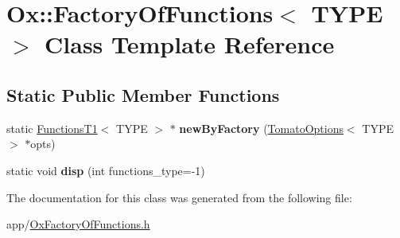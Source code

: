 \hypertarget{class_ox_1_1_factory_of_functions}{\section{Ox\-:\-:Factory\-Of\-Functions$<$ T\-Y\-P\-E $>$ Class Template Reference}
\label{class_ox_1_1_factory_of_functions}
}
\subsection*{Static Public Member Functions}
\begin{DoxyCompactItemize}
\item 
\hypertarget{class_ox_1_1_factory_of_functions_a188a9a0d61fcbca185c90e548be71bf0}{static \hyperlink{class_ox_1_1_functions_t1}{Functions\-T1}$<$ T\-Y\-P\-E $>$ $\ast$ {\bfseries new\-By\-Factory} (\hyperlink{struct_ox_1_1_tomato_options}{Tomato\-Options}$<$ T\-Y\-P\-E $>$ $\ast$opts)}\label{class_ox_1_1_factory_of_functions_a188a9a0d61fcbca185c90e548be71bf0}

\item 
\hypertarget{class_ox_1_1_factory_of_functions_aa723d7a59c0bfc42d25f5599bb36cd33}{static void {\bfseries disp} (int functions\-\_\-type=-\/1)}\label{class_ox_1_1_factory_of_functions_aa723d7a59c0bfc42d25f5599bb36cd33}

\end{DoxyCompactItemize}


The documentation for this class was generated from the following file\-:\begin{DoxyCompactItemize}
\item 
app/\hyperlink{_ox_factory_of_functions_8h}{Ox\-Factory\-Of\-Functions.\-h}\end{DoxyCompactItemize}
